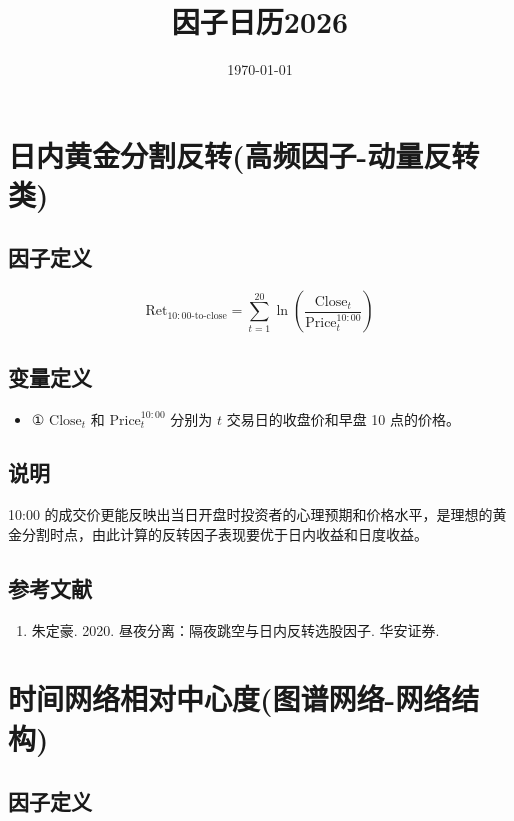 \documentclass{article}
\title{因子日历2026}
\date{\today}
\begin{document}
\maketitle

\section{日内黄金分割反转(高频因子-动量反转类)}

\subsection{因子定义}

\begin{equation}
    \mathrm{Ret}_{10:00\text{-to-close}} = \sum_{t=1}^{20} \ln \left( \frac{\mathrm{Close}_t}{\mathrm{Price}_t^{10:00}} \right)
\end{equation}

\subsection{变量定义}
\begin{itemize}
    \item ① \( \mathrm{Close}_t \) 和 \( \mathrm{Price}_t^{10:00} \) 分别为 \( t \) 交易日的收盘价和早盘 10 点的价格。
\end{itemize}

\subsection{说明}
10:00 的成交价更能反映出当日开盘时投资者的心理预期和价格水平，是理想的黄金分割时点，由此计算的反转因子表现要优于日内收益和日度收益。

\subsection{参考文献}
\begin{enumerate}
    \item 朱定豪. 2020. 昼夜分离：隔夜跳空与日内反转选股因子. 华安证券.
\end{enumerate}

\section{时间网络相对中心度(图谱网络-网络结构)}

\subsection{因子定义}
\end{document}
